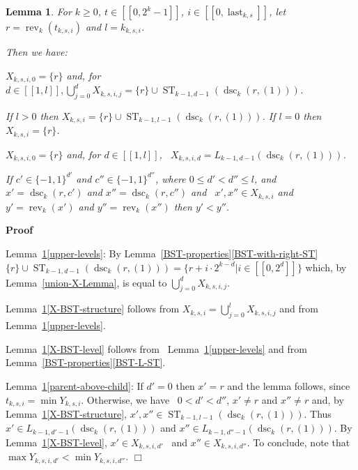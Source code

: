 \documentclass{article}
\newcommand{\tmop}[1]{\ensuremath{\operatorname{#1}}}
\newenvironment{enumeratealpha}{\begin{enumerate}[a{\textup{)}}] }{\end{enumerate}}
\newenvironment{proof}{\noindent\textbf{Proof\ }}{\hspace*{\fill}$\Box$\medskip}
\newtheorem{lemma}{Lemma}
\begin{document}
\begin{lemma}
  \label{X-BST} For $k \geq 0$, $t \in [[0, 2^k - 1]]$, $i \in [[0,
  \tmop{last}_{k, s}]]$, let $r = \tmop{rev}_k (t_{k, s, i})$ and $l = k_{k,
  s, i}$.
  
  Then we have:
  \begin{enumeratealpha}
    {\color{black} \item \label{upper-levels} $X_{k, s, i, 0} =\{r\}$ and, for
    $\text{$d \in [[1, l]]$}, \bigcup_{j = 0}^d X_{k, s, i, j} =\{r\} \cup
    \tmop{ST}_{k - 1, d - 1} (\tmop{dsc}_k (r, (1)))$.}
    
    \item \label{X-BST-structure} If $l > 0$ then $X_{k, s, i} =\{r\} \cup
    \tmop{ST}_{k - 1, l - 1} (\tmop{dsc}_k (r, (1)))$. If $l = 0$ then $X_{k,
    s, i} =\{r\}$.
    
    {\color{black} \item \label{X-BST-level}$X_{k, s, i, 0} =\{r\}$ and, for
    $d \in [[1, l]]$, \ $X_{k, s, i, d} = L_{k - 1, d - 1} (\tmop{dsc}_k (r,
    (1)))$.}
    
    \item \label{parent-above-child}If $c' \in \{- 1, 1\}^{d'}$ and $c'' \in
    \{- 1, 1\}^{d''}$, where $0 \leq d' < d'' \leq l$, and $x' = \tmop{dsc}_k
    (r, c')$ and $x'' = \tmop{dsc}_k (r, c'')$ and \ $x', x'' \in X_{k, s, i}$
    and $y' = \tmop{rev}_k (x')$ and $y'' = \tmop{rev}_k (x'')$ then $y' <
    y''$.
  \end{enumeratealpha}
\end{lemma}

\begin{proof}
  
  
  Lemma~\ref{X-BST}\ref{upper-levels}: By
  Lemma~\ref{BST-properties}\ref{BST-with-right-ST} $\{r\} \cup \tmop{ST}_{k
  - 1, d - 1} (\tmop{dsc}_k (r, (1))) =\{r + i \cdot 2^{k - d} | i \in [[0,
  2^d]]\}$ which, by Lemma~\ref{union-X-Lemma}, is equal to $\bigcup_{j = 0}^d
  X_{k, s, i, j}$.
  
  Lemma~\ref{X-BST}\ref{X-BST-structure} follows from $X_{k, s, i} =
  \bigcup_{j = 0}^l X_{k, s, i, j}$ and from
  Lemma~\ref{X-BST}\ref{upper-levels}.
  
  Lemma~\ref{X-BST}\ref{X-BST-level} follows from \
  Lemma~\ref{X-BST}\ref{upper-levels} and from
  Lemma~\ref{BST-properties}\ref{BST-L-ST}.
  
  Lemma~\ref{X-BST}\ref{parent-above-child}: If $d' = 0$ then $x' = r$ and
  the lemma follows, since $t_{k, s, i} = \min Y_{k, s, i}$. Otherwise, we
  have \ $0 < d' < d''$, $x' \not=  r$ and $x'' \not=  r$ and, by
  Lemma~\ref{X-BST}\ref{X-BST-structure}, $x', x'' \in \tmop{ST}_{k - 1, l -
  1} (\tmop{dsc}_k (r, (1)))$. Thus $x' \in L_{k - 1, d' - 1} (\tmop{dsc}_k
  (r, (1)))$ and $x'' \in L_{k - 1, d'' - 1} (\tmop{dsc}_k (r, (1)))$. By
  Lemma~\ref{X-BST}\ref{X-BST-level}, $x' \in X_{k, s, i, d'}$ \ and $x'' \in
  X_{k, s, i, d''}$. To conclude, note that $\max Y_{k, s, i, d'} < \min Y_{k,
  s, i, d''}$. 
\end{proof}
\end{document}
